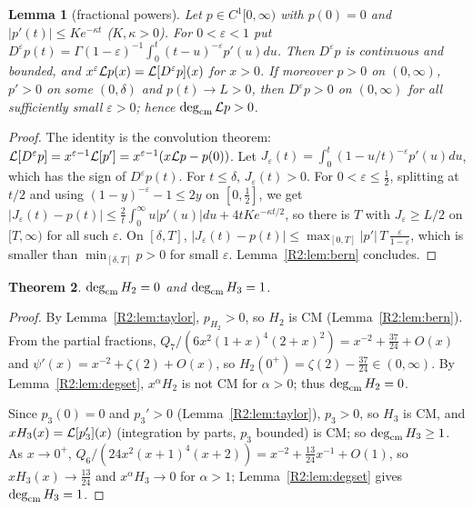 \documentclass[11pt]{amsart}
\newtheorem{theorem}{Theorem}[section]
\newtheorem{lemma}[theorem]{Lemma}
\theoremstyle{definition}
\theoremstyle{remark}
\begin{document}
\begin{lemma}[fractional powers]\label{R2:lem:frac}
Let $p\in C^1[0,\infty)$ with $p(0)=0$ and $|p'(t)|\le Ke^{-\kappa t}$
($K,\kappa>0$). For $0<\varepsilon<1$ put
$D^\varepsilon p(t)=\Gamma(1-\varepsilon)^{-1}\int_0^t(t-u)^{-\varepsilon}p'(u)du$.
Then $D^\varepsilon p$ is continuous and bounded, and
$x^\varepsilon\mathcal{L} p(x)=\mathcal{L}[D^\varepsilon p](x)$ for $x>0$. If moreover
$p>0$ on $(0,\infty)$, $p'>0$ on some $(0,\delta)$ and $p(t)\to L>0$, then
$D^\varepsilon p>0$ on $(0,\infty)$ for all sufficiently small
$\varepsilon>0$; hence $\operatorname{deg}_{\mathrm{cm}}\mathcal{L} p>0$.
\end{lemma}
\begin{proof}
The identity is the convolution theorem:
$\mathcal{L}[D^\varepsilon p]=x^{\varepsilon-1}\mathcal{L}[p']=x^{\varepsilon-1}(x\mathcal{L} p-p(0))$.
Let $J_\varepsilon(t)=\int_0^t(1-u/t)^{-\varepsilon}p'(u)du$, which has the
sign of $D^\varepsilon p(t)$. For $t\le\delta$, $J_\varepsilon(t)>0$. For
$0<\varepsilon\le\frac12$, splitting at $t/2$ and using
$(1-y)^{-\varepsilon}-1\le2y$ on $[0,\frac12]$, we get
$|J_\varepsilon(t)-p(t)|\le\frac2t\int_0^\infty u|p'(u)|du+4tKe^{-\kappa t/2}$,
so there is $T$ with $J_\varepsilon\ge L/2$ on $[T,\infty)$ for all such
$\varepsilon$. On $[\delta,T]$,
$|J_\varepsilon(t)-p(t)|\le\max_{[0,T]}|p'|\,T\,\frac{\varepsilon}{1-\varepsilon}$,
which is smaller than $\min_{[\delta,T]}p>0$ for small $\varepsilon$.
Lemma~\ref{R2:lem:bern} concludes.
\end{proof}

\begin{theorem}\label{R2:thm:E}
$\operatorname{deg}_{\mathrm{cm}} H_2=0$ and $\operatorname{deg}_{\mathrm{cm}} H_3=1$.
\end{theorem}
\begin{proof}
By Lemma~\ref{R2:lem:taylor}, $p_{H_2}>0$, so $H_2$ is CM
(Lemma~\ref{R2:lem:bern}). From the partial fractions,
$Q_7/(6x^2(1+x)^4(2+x)^2)=x^{-2}+\frac{37}{24}+O(x)$ and
$\psi'(x)=x^{-2}+\zeta(2)+O(x)$, so
$H_2(0^+)=\zeta(2)-\frac{37}{24}\in(0,\infty)$. By
Lemma~\ref{R2:lem:degset}, $x^\alpha H_2$ is not CM for $\alpha>0$; thus
$\operatorname{deg}_{\mathrm{cm}} H_2=0$.

Since $p_3(0)=0$ and $p_3'>0$ (Lemma~\ref{R2:lem:taylor}), $p_3>0$, so $H_3$
is CM, and $xH_3(x)=\mathcal{L}[p_3'](x)$ (integration by parts, $p_3$ bounded) is
CM; so $\operatorname{deg}_{\mathrm{cm}} H_3\ge1$. As $x\to0^+$,
$Q_6/(24x^2(x+1)^4(x+2))=x^{-2}+\frac{13}{24}x^{-1}+O(1)$, so
$xH_3(x)\to\frac{13}{24}$ and $x^\alpha H_3\to0$ for $\alpha>1$;
Lemma~\ref{R2:lem:degset} gives $\operatorname{deg}_{\mathrm{cm}} H_3=1$.
\end{proof}
\end{document}
